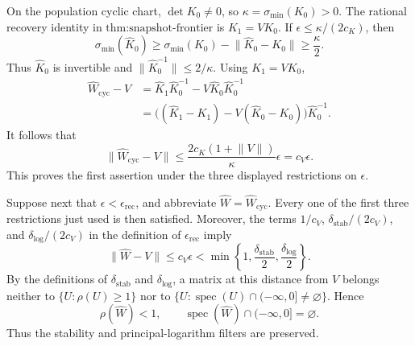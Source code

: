 On the population cyclic chart, \(\det K_0\ne0\), so \(\kappa=\sigma_{\min}(K_0)>0\).  The rational recovery identity in \(\text{thm:snapshot-frontier}\) is \(K_1=VK_0\).  If \(\epsilon\le\kappa/(2c_K)\), then
\[
 \sigma_{\min}(\widehat K_0)
 \ge \sigma_{\min}(K_0)-\lVert\widehat K_0-K_0\rVert
 \ge \frac{\kappa}{2}.
\]
Thus \(\widehat K_0\) is invertible and \(\lVert\widehat K_0^{-1}\rVert\le2/\kappa\).  Using \(K_1=VK_0\),
\[
 \begin{aligned}
 \widehat W_{\mathrm{cyc}}-V
 &=\widehat K_1\widehat K_0^{-1}-V\widehat K_0\widehat K_0^{-1}\\
 &=\bigl((\widehat K_1-K_1)-V(\widehat K_0-K_0)\bigr)\widehat K_0^{-1}.
 \end{aligned}
\]
It follows that
\[
 \lVert\widehat W_{\mathrm{cyc}}-V\rVert
 \le \frac{2c_K(1+\lVert V\rVert)}{\kappa}\epsilon
 =c_V\epsilon.
\]
This proves the first assertion under the three displayed restrictions on \(\epsilon\).

Suppose next that \(\epsilon<\epsilon_{\mathrm{rec}}\), and abbreviate \(\widehat W=\widehat W_{\mathrm{cyc}}\).  Every one of the first three restrictions just used is then satisfied.  Moreover, the terms \(1/c_V\), \(\delta_{\mathrm{stab}}/(2c_V)\), and \(\delta_{\log}/(2c_V)\) in the definition of \(\epsilon_{\mathrm{rec}}\) imply
\[
 \lVert\widehat W-V\rVert
 \le c_V\epsilon
 <\min\left\{1,\frac{\delta_{\mathrm{stab}}}{2},
                    \frac{\delta_{\log}}{2}\right\}.
\]
By the definitions of \(\delta_{\mathrm{stab}}\) and \(\delta_{\log}\), a matrix at this distance from \(V\) belongs neither to \(\{U:\rho(U)\ge1\}\) nor to \(\{U:\operatorname{spec}(U)\cap(-\infty,0]\ne\varnothing\}\).  Hence
\[
 \rho(\widehat W)<1,
 \qquad
 \operatorname{spec}(\widehat W)\cap(-\infty,0]=\varnothing.
\]
Thus the stability and principal-logarithm filters are preserved.

